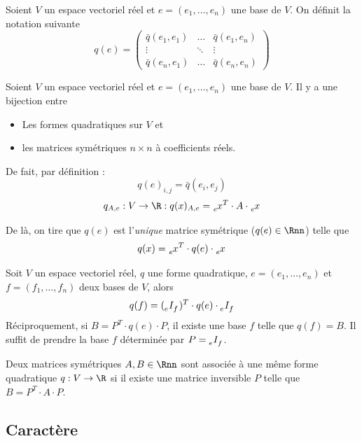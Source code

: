 \begin{mynota}
	Soient $V$ un espace vectoriel réel et $e = (e_1, \dots , e_n)$ une base de $V$.
	On définit la notation suivante
	\[ q(e) =
	\begin{pmatrix}
		\bar{q}(e_1,e_1) & \ldots & \bar{q}(e_1,e_n)\\
		\vdots & \ddots & \vdots\\
		\bar{q}(e_n,e_1) & \ldots & \bar{q}(e_n,e_n)
	\end{pmatrix}
	\]
\end{mynota}

\begin{myprop}
	Soient $V$ un espace vectoriel réel et $e = (e_1, \dots , e_n)$ une base de $V$.
	Il y a une bijection entre
	\begin{itemize}
		\item Les formes quadratiques sur $V$ et
		\item les matrices symétriques $n \times n$ à coefficients réels.
	\end{itemize}
	De fait, par définition :
	\[ q(e)_{i,j} = \bar{q}(e_i, e_j) \]
	\[ q_{A,e} : V \rightarrow \R : q(x)_{A,e} = \tensor[_e]{x}{^T} \cdot A \cdot \tensor[_e]{x}{} \]
\end{myprop}

\begin{mycorr}
	De là, on tire que $q(e)$ est l'\emph{unique} matrice symétrique ($q(e) \in \Rnn$) telle que
	\[ q(x) = \tensor[_e]{x}{^T} \cdot q(e) \cdot \tensor[_e]{x}{} \]
\end{mycorr}

\begin{mycorr} Soit $V$ un espace vectoriel réel, $q$ une forme quadratique, $e = (e_1, \dots , e_n)$ et $f = (f_1, \dots, f_n)$ deux bases de $V$, alors
	\[ q(f) = (\tensor[_e]{I}{_f})^T \cdot q(e) \cdot \tensor[_e]{I}{_f} \]
	Réciproquement, si $B = P^T \cdot q(e) \cdot P$, il existe une base $f$ telle que $q(f) = B$.
	Il suffit de prendre la base $f$ déterminée par $P = \tensor[_e]{I}{_f}$.
\end{mycorr}

\begin{myrem}
	Deux matrices symétriques $A, B \in \Rnn$ sont associée à une même forme quadratique $q: V \to \R$ si il existe une matrice inversible $P$ telle que $B = P^T \cdot A \cdot P$.
\end{myrem}

\subsection{Caractère}

